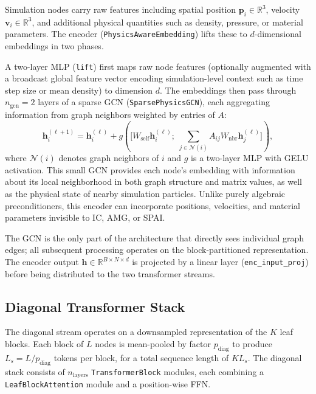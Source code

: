 \documentclass[acmtog,anonymous,review]{acmart}
\begin{document}
Simulation nodes carry raw features including spatial position $\mathbf{p}_i \in \mathbb{R}^3$,
velocity $\mathbf{v}_i \in \mathbb{R}^3$, and additional physical quantities such as density,
pressure, or material parameters.  The encoder (\texttt{PhysicsAwareEmbedding}) lifts these to
$d$-dimensional embeddings in two phases.

A two-layer MLP (\texttt{lift}) first maps raw node features (optionally augmented with a
broadcast global feature vector encoding simulation-level context such as time step size or mean
density) to dimension $d$.  The embeddings then pass through $n_\mathrm{gcn} = 2$ layers of a
sparse GCN (\texttt{SparsePhysicsGCN}), each aggregating information from graph neighbors
weighted by entries of $A$:
\begin{equation}
  \mathbf{h}_i^{(\ell+1)} = \mathbf{h}_i^{(\ell)} + g\!\left(\bigl[W_\mathrm{self}
  \mathbf{h}_i^{(\ell)};\; \textstyle\sum_{j \in \mathcal{N}(i)} A_{ij} W_\mathrm{nbr}
  \mathbf{h}_j^{(\ell)}\bigr]\right),
  \label{eq:gcn}
\end{equation}
where $\mathcal{N}(i)$ denotes graph neighbors of $i$ and $g$ is a two-layer MLP with GELU
activation.  This small GCN provides each node's embedding with information about its local
neighborhood in both graph structure and matrix values, as well as the physical state of nearby
simulation particles.  Unlike purely algebraic preconditioners, this encoder can incorporate
positions, velocities, and material parameters invisible to IC, AMG, or SPAI.

The GCN is the only part of the architecture that directly sees individual graph edges; all
subsequent processing operates on the block-partitioned representation.  The encoder output
$\mathbf{h} \in \mathbb{R}^{B \times N \times d}$ is projected by a linear layer
(\texttt{enc\_input\_proj}) before being distributed to the two transformer streams.

\subsection{Diagonal Transformer Stack}
\label{sec:method:diag}

The diagonal stream operates on a downsampled representation of the $K$ leaf blocks.  Each block
of $L$ nodes is mean-pooled by factor $p_\mathrm{diag}$ to produce $L_s = L/p_\mathrm{diag}$
tokens per block, for a total sequence length of $K L_s$.  The diagonal stack consists of
$n_\mathrm{layers}$ \texttt{TransformerBlock} modules, each combining a \texttt{LeafBlockAttention}
module and a position-wise FFN.
\end{document}
